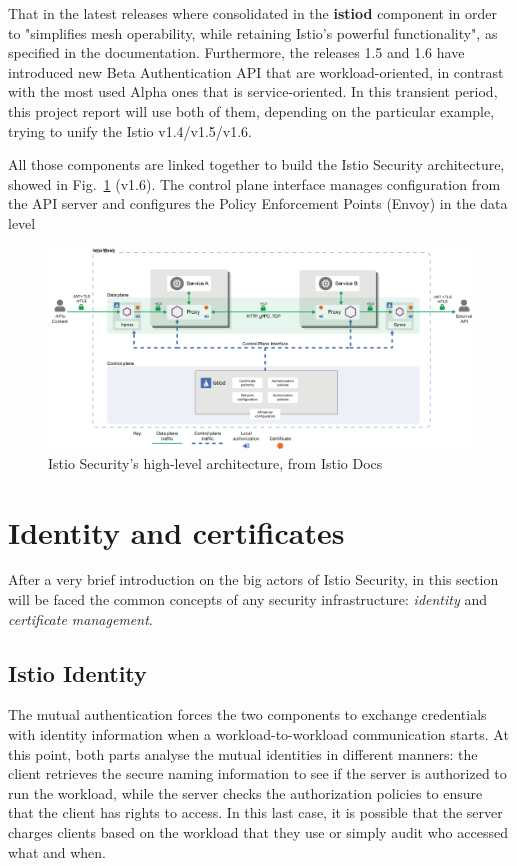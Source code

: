 That in the latest releases where consolidated in the \textbf{istiod} component in order to "simplifies mesh operability, while retaining Istio’s powerful functionality", as specified in the documentation. Furthermore, the releases 1.5 and 1.6 have introduced new Beta Authentication API that are workload-oriented, in contrast with the most used Alpha ones that is service-oriented. In this transient period, this project report will use both of them, depending on the particular example, trying to unify the Istio v1.4/v1.5/v1.6.

All those components are linked together to build the Istio Security architecture, showed in Fig.~\ref{fig:hlarch} (v1.6). The control plane interface manages configuration from the API server and configures the Policy Enforcement Points (Envoy) in the data level

\begin{figure}
    \centering
    \includegraphics{chapters/images/chp1/arch-sec.png}
    \caption{Istio Security's high-level architecture, from Istio Docs}
    \label{fig:hlarch}
\end{figure}

\section{Identity and certificates}
After a very brief introduction on the big actors of Istio Security, in this section will be faced the common concepts of any security infrastructure: \textit{identity} and \textit{certificate management}.

\subsection{Istio Identity}
The mutual authentication forces the two components to exchange credentials with identity information when a workload-to-workload communication starts. At this point, both parts analyse the mutual identities in different manners: the client retrieves the secure naming information to see if the server is authorized to run the workload, while the server checks the authorization policies to ensure that the client has rights to access. 
In this last case, it is possible that the server charges clients based on the workload that they use or simply audit who accessed what and when.

